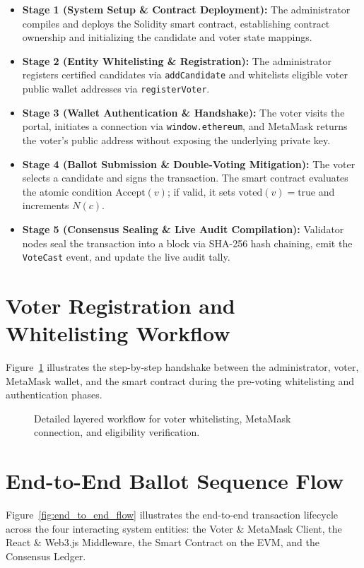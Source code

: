 \documentclass[12pt,a4paper]{report}
\begin{document}
\begin{itemize}
    \item \textbf{Stage 1 (System Setup \& Contract Deployment):} The administrator compiles and deploys the Solidity smart contract, establishing contract ownership and initializing the candidate and voter state mappings.
    \item \textbf{Stage 2 (Entity Whitelisting \& Registration):} The administrator registers certified candidates via \texttt{addCandidate} and whitelists eligible voter public wallet addresses via \texttt{registerVoter}.
    \item \textbf{Stage 3 (Wallet Authentication \& Handshake):} The voter visits the portal, initiates a connection via \texttt{window.ethereum}, and MetaMask returns the voter's public address without exposing the underlying private key.
    \item \textbf{Stage 4 (Ballot Submission \& Double-Voting Mitigation):} The voter selects a candidate and signs the transaction. The smart contract evaluates the atomic condition $\text{Accept}(v)$; if valid, it sets $\text{voted}(v) = \text{true}$ and increments $N(c)$.
    \item \textbf{Stage 5 (Consensus Sealing \& Live Audit Compilation):} Validator nodes seal the transaction into a block via SHA-256 hash chaining, emit the \texttt{VoteCast} event, and update the live audit tally.
\end{itemize}

\clearpage
\section{Voter Registration and Whitelisting Workflow}
Figure~\ref{fig:voter_workflow} illustrates the step-by-step handshake between the administrator, voter, MetaMask wallet, and the smart contract during the pre-voting whitelisting and authentication phases.

\begin{figure}[H]
\centering
{}
\caption{Detailed layered workflow for voter whitelisting, MetaMask connection, and eligibility verification.}
\label{fig:voter_workflow}
\end{figure}

\section{End-to-End Ballot Sequence Flow}
Figure~\ref{fig:end_to_end_flow} illustrates the end-to-end transaction lifecycle across the four interacting system entities: the Voter \& MetaMask Client, the React \& Web3.js Middleware, the Smart Contract on the EVM, and the Consensus Ledger.
\end{document}
